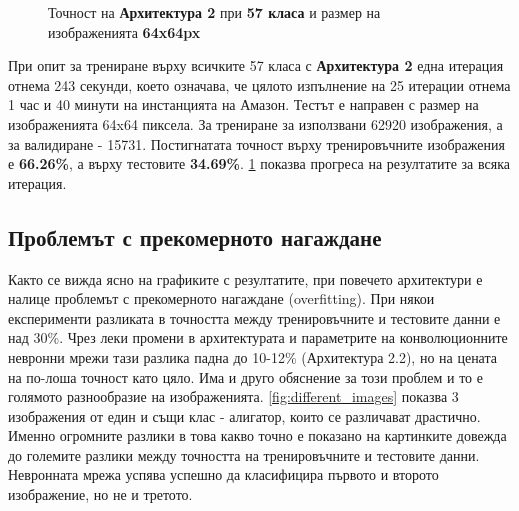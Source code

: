 \begin{figure}[H]
\centering
{}
\caption{Точност на \textbf{Архитектура 2} при \textbf{57 класа} и размер на изображенията \textbf{64x64px}}
\label{plot:plt_arch2_57cl}
\end{figure}


При опит за трениране върху всичките 57 класа с \textbf{Архитектура 2} една итерация отнема 243 секунди, което означава, че цялото изпълнение на 25 итерации отнема 1 час и 40 минути на инстанцията на Амазон. Тестът е направен с размер на изображенията 64x64 пиксела. За трениране за използвани 62920 изображения, а за валидиране - 15731. Постигнатата точност върху тренировъчните изображения е \textbf{66.26\%}, а върху тестовите \textbf{34.69\%}. \ref{plot:plt_arch2_57cl} показва прогреса на резултатите за всяка итерация.



\subsection{Проблемът с прекомерното нагаждане}

Както се вижда ясно на графиките с резултатите, при повечето архитектури е налице проблемът с прекомерното нагаждане (overfitting). При някои експерименти разликата в точността между тренировъчните и тестовите данни е над 30\%. Чрез леки промени в архитектурата и параметрите на конволюционните невронни мрежи тази разлика падна до 10-12\% (Архитектура 2.2), но на цената на по-лоша точност като цяло. Има и друго обяснение за този проблем и то е голямото разнообразие на изображенията. \ref{fig:different_images} показва 3 изображения от един и същи клас - алигатор, които се различават драстично. Именно огромните разлики в това какво точно е показано на картинките довежда до големите разлики между точността на тренировъчните и тестовите данни. Невронната мрежа успява успешно да класифицира първото и второто изображение, но не и третото.


